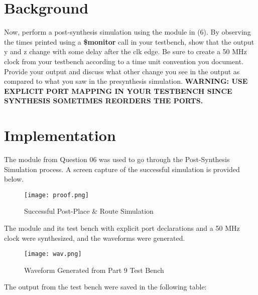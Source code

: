 \documentclass[paper=usletter, fontsize=12pt]{article}
\begin{document}
    \vspace{-0.1in}

    \section{Background}
    Now, perform a post-synthesis simulation using the module in (6). By observing the times printed using a \textbf{\$monitor} call in your testbench, show that the output y and z change with some delay after the clk edge. Be sure to create a 50 MHz clock from your testbench according to a time unit convention you document. Provide your output and discuss what other change you see in the output as compared to what you saw in the presynthesis simulation. \textbf{WARNING: USE EXPLICIT PORT MAPPING IN YOUR TESTBENCH SINCE SYNTHESIS SOMETIMES REORDERS THE PORTS.}

    \section{Implementation}
    The module from Question 06 was used to go through the Post-Synthesis Simulation process. A screen capture of the successful simulation is provided below.

    \begin{figure}[ht]
        \begin{center}
            \texttt{[image: proof.png]}
            \caption{Successful Post-Place \& Route Simulation} \label{fig:proof}
        \end{center}
    \end{figure}

    The module and its test bench with explicit port declarations and a 50 MHz clock were synthesized, and the waveforms were generated.

    \begin{figure}[ht]
        \begin{center}
            \texttt{[image: wav.png]}
            \caption{Waveform Generated from Part 9 Test Bench} \label{fig:wav}
        \end{center}
    \end{figure}

    The output from the test bench were saved in the following table:
\end{document}
